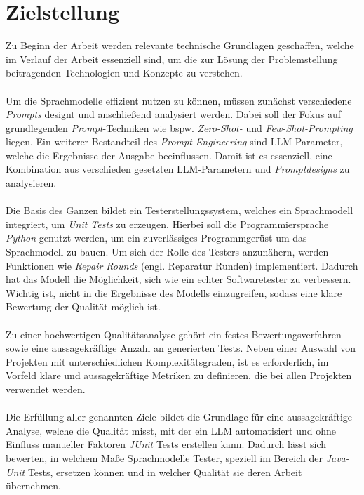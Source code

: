 \section{Zielstellung}\label{sec:goal}
Zu Beginn der Arbeit werden relevante technische Grundlagen geschaffen, welche im Verlauf der Arbeit essenziell sind, um die zur Lösung der Problemstellung beitragenden Technologien und Konzepte zu verstehen.\\\\ Um die Sprachmodelle effizient nutzen zu können, müssen zunächst verschiedene \textit{Prompts} designt und anschließend analysiert werden. Dabei soll der Fokus auf grundlegenden \textit{Prompt}-Techniken wie bspw. \textit{Zero-Shot-} und \textit{Few-Shot-Prompting} liegen. Ein weiterer Bestandteil des \textit{Prompt Engineering} sind LLM-Parameter, welche die Ergebnisse der Ausgabe beeinflussen. Damit ist es essenziell, eine Kombination aus verschieden gesetzten LLM-Parametern und \textit{Promptdesigns} zu analysieren.\\\\ Die Basis des Ganzen bildet ein Testerstellungssystem, welches ein Sprachmodell integriert, um \textit{Unit Tests} zu erzeugen. Hierbei soll die Programmiersprache \textit{Python} genutzt werden, um ein zuverlässiges Programmgerüst um das Sprachmodell zu bauen. 
Um sich der Rolle des Testers anzunähern, werden Funktionen wie \textit{Repair Rounds} (engl. Reparatur Runden) implementiert. Dadurch hat das Modell die Möglichkeit, sich wie ein echter Softwaretester zu verbessern. Wichtig ist, nicht in die Ergebnisse des Modells einzugreifen, sodass eine klare Bewertung der Qualität möglich ist.\\\\ Zu einer hochwertigen Qualitätsanalyse gehört ein festes Bewertungsverfahren sowie eine aussagekräftige Anzahl an generierten Tests. Neben einer Auswahl von Projekten mit unterschiedlichen Komplexitätsgraden, ist es erforderlich, im Vorfeld klare und aussagekräftige Metriken zu definieren, die bei allen Projekten verwendet werden.\\\\ Die Erfüllung aller genannten Ziele bildet die Grundlage für eine aussagekräftige Analyse, welche die Qualität misst, mit der ein LLM automatisiert und ohne Einfluss manueller Faktoren \textit{JUnit} Tests erstellen kann. Dadurch lässt sich bewerten, in welchem Maße Sprachmodelle Tester, speziell im Bereich der \textit{Java-Unit} Tests, ersetzen können und in welcher Qualität sie deren Arbeit übernehmen.